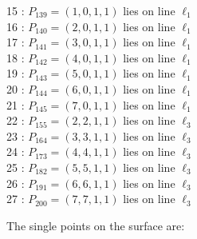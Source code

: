 \documentclass{article}
\begin{document}
{\begin{multicols}{2}
15 : $P_{139}=( 1, 0, 1, 1 )$ lies on line $\ell_{1}$\\
16 : $P_{140}=( 2, 0, 1, 1 )$ lies on line $\ell_{1}$\\
17 : $P_{141}=( 3, 0, 1, 1 )$ lies on line $\ell_{1}$\\
18 : $P_{142}=( 4, 0, 1, 1 )$ lies on line $\ell_{1}$\\
19 : $P_{143}=( 5, 0, 1, 1 )$ lies on line $\ell_{1}$\\
20 : $P_{144}=( 6, 0, 1, 1 )$ lies on line $\ell_{1}$\\
21 : $P_{145}=( 7, 0, 1, 1 )$ lies on line $\ell_{1}$\\
22 : $P_{155}=( 2, 2, 1, 1 )$ lies on line $\ell_{3}$\\
23 : $P_{164}=( 3, 3, 1, 1 )$ lies on line $\ell_{3}$\\
24 : $P_{173}=( 4, 4, 1, 1 )$ lies on line $\ell_{3}$\\
25 : $P_{182}=( 5, 5, 1, 1 )$ lies on line $\ell_{3}$\\
26 : $P_{191}=( 6, 6, 1, 1 )$ lies on line $\ell_{3}$\\
27 : $P_{200}=( 7, 7, 1, 1 )$ lies on line $\ell_{3}$\\
\end{multicols}
The single points on the surface are:\\
}
\end{document}
